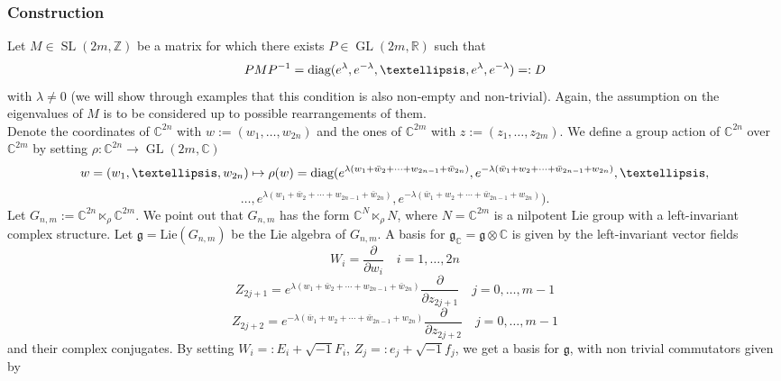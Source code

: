 \documentclass[a4paper, 11pt]{amsart}
\theoremstyle{plain}
\theoremstyle{definition}
\newcommand{\del}{\partial}
\DeclareMathOperator{\GL}{GL}
\DeclareMathOperator{\SL}{SL}
\numberwithin{equation}{section}
\begin{document}
\subsubsection{Construction} Let $M \in \SL(2m, \mathbb{Z})$ be a matrix for which there exists $P \in \GL(2m, \mathbb{R})$ such that 
\[PMP^{-1} = \hbox{diag}(e^{\lambda}, e^{-\lambda}, \ldots, e^{\lambda}, e^{-\lambda}) =: D \]
with $\lambda \ne 0$ (we will show through examples that this condition is also non-empty and non-trivial). Again, the assumption on the eigenvalues of $M$ is to be considered up to possible rearrangements of them.\\[5pt]
Denote the coordinates of $\mathbb{C}^{2n}$ with $w := (w_{1}, \ldots, w_{2n})$ and the ones of $\mathbb{C}^{2m}$ with $z := (z_{1}, \ldots, z_{2m})$. We define a group action of $\mathbb{C}^{2n}$ over $\mathbb{C}^{2m}$ by setting $\rho : \mathbb{C}^{2n} \rightarrow \GL(2m, \mathbb{C})$
\[w = (w_{1}, \ldots, w_{2n}) \mapsto \rho(w) = \hbox{diag}(e^{\lambda(w_{1} + \bar w_{2} + \cdots + w_{2n-1} + \bar w_{2n})}, e^{-\lambda(\bar w_{1} + w_{2} + \cdots + \bar w_{2n-1} + w_{2n})}, \ldots, \]
\[ \ldots, e^{\lambda(w_{1} + \bar w_{2} + \cdots + w_{2n-1} + \bar w_{2n})}, e^{-\lambda(\bar w_{1} + w_{2} + \cdots + \bar w_{2n-1} + w_{2n})}). \]
Let $G_{n,m} := \mathbb{C}^{2n} \ltimes_{\rho} \mathbb{C}^{2m}$. We point out that $G_{n,m}$ has the form $\mathbb{C}^{N} \ltimes_{\rho} N$, where $N = \mathbb{C}^{2m}$ is a nilpotent Lie group with a left-invariant complex structure. Let $\mathfrak{g} = \text{Lie}(G_{n,m})$ be the Lie algebra of $G_{n,m}$. A basis for $\mathfrak{g}_{\mathbb{C}} = \mathfrak{g} \otimes \mathbb{C}$ is given by the left-invariant vector fields
\[ W_{i} = \frac{\del}{\del w_{i}} \quad i = 1, \ldots, 2n \]
\[Z_{2j+1} = e^{\lambda(w_{1} + \bar w_{2} + \cdots + w_{2n-1} + \bar w_{2n})}\frac{\del}{\del z_{2j+1}} \quad j = 0, \ldots, m-1 \]
\[Z_{2j+2} = e^{-\lambda(\bar w_{1} + w_{2} + \cdots + \bar w_{2n-1} + w_{2n})}\frac{\del}{\del z_{2j+2}} \quad j = 0, \ldots, m-1 \]
and their complex conjugates. By setting $W_{i} =: E_{i} + \sqrt{-1}F_{i}$, $Z_{j} =: e_{j} + \sqrt{-1}f_{j} $, we get a basis for $\mathfrak{g}$, with non trivial commutators given by
\end{document}
